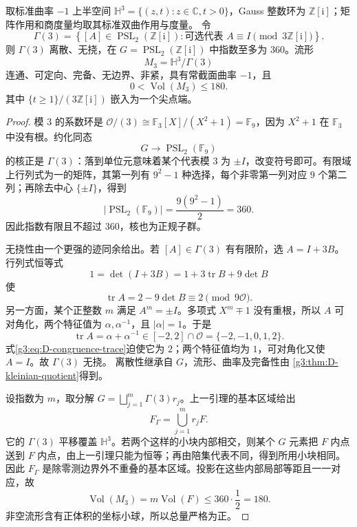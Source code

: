\begin{theorem}\label{g3:thm:D-gaussian-finite-volume}
	取标准曲率 \(-1\) 上半空间 \(\mathbb H^3=\{(z,t):z\in\mathbb C,t>0\}\)，Gauss 整数环为 \(\mathbb Z[\mathrm i]\)；矩阵作用和商度量均取其标准双曲作用与度量。
	令
	\[
		\Gamma(3)=
		\left\{[A]\in\operatorname{PSL}_2(\mathbb Z[\mathrm i]):
		    \text{可选代表 }A\equiv I\pmod{3\mathbb Z[\mathrm i]}\right\}.
	\]
	则 \(\Gamma(3)\) 离散、无挠，在 \(G=\operatorname{PSL}_2(\mathbb Z[\mathrm i])\)
	中指数至多为 \(360\)。流形
	\[
		M_3=\mathbb H^3/\Gamma(3)
	\]
	连通、可定向、完备、无边界、非紧，具有常截面曲率 \(-1\)，且
	\[
		0<\operatorname{Vol}(M_3)\le180.
	\]
	其中 \(\{t\ge1\}/(3\mathbb Z[\mathrm i])\) 嵌入为一个尖点端。
\end{theorem}
\begin{proof}
	模 \(3\) 的系数环是
	\(\mathcal O/(3)\cong\mathbb F_3[X]/(X^2+1)=\mathbb F_9\)，因为
	\(X^2+1\) 在 \(\mathbb F_3\) 中没有根。约化同态
	\[
		G\longrightarrow\operatorname{PSL}_2(\mathbb F_9)
	\]
	的核正是 \(\Gamma(3)\)：落到单位元意味着某个代表模 \(3\) 为
	\(\pm I\)，改变符号即可。有限域上行列式为一的矩阵，其第一列有
	\(9^2-1\) 种选择，每个非零第一列对应 \(9\) 个第二列；再除去中心
	\(\{\pm I\}\)，得到
	\[
		|\operatorname{PSL}_2(\mathbb F_9)|
		     =\frac{9(9^2-1)}2=360.
	\]
	因此指数有限且不超过 \(360\)，核也为正规子群。

	无挠性由一个更强的迹同余给出。若 \([A]\in\Gamma(3)\) 有有限阶，选
	\(A=I+3B\)。行列式恒等式
	\[
		1=\det(I+3B)=1+3\operatorname{tr}B+9\det B
	\]
	使
	\begin{equation}\label{g3:eq:D-congruence-trace}
		\operatorname{tr}A=2-9\det B\equiv2\pmod{9\mathcal O}.
	\end{equation}
	另一方面，某个正整数 \(m\) 满足 \(A^m=\pm I\)。多项式
	\(X^m\mp1\) 没有重根，所以 \(A\) 可对角化，两个特征值为
	\(\alpha,\alpha^{-1}\)，且 \(|\alpha|=1\)。于是
	\[
		\operatorname{tr}A=\alpha+\alpha^{-1}\in[-2,2]\cap\mathcal O
		                         =\{-2,-1,0,1,2\}.
	\]
	式\eqref{g3:eq:D-congruence-trace}迫使它为 \(2\)；两个特征值均为
	\(1\)，可对角化又使 \(A=I\)。故 \(\Gamma(3)\) 无挠。
	离散性继承自 \(G\)，流形、曲率及完备性由
	\cref{g3:thm:D-kleinian-quotient}得到。

	设指数为 \(m\)，取分解
	\(G=\bigsqcup_{j=1}^m\Gamma(3)r_j\)。上一引理的基本区域给出
	\[
		F_{\Gamma}=\bigcup_{j=1}^m r_jF.
	\]
	它的 \(\Gamma(3)\) 平移覆盖 \(\mathbb H^3\)。若两个这样的小块内部相交，则某个 \(G\) 元素把 \(F\) 内点送到 \(F\) 内点，由上一引理只能为恒等；再由陪集代表不同，得到所用小块相同。因此 \(F_\Gamma\) 是除零测边界外不重叠的基本区域。投影在这些内部局部等距且一一对应，故
	\[
		\operatorname{Vol}(M_3)
		    =m\operatorname{Vol}(F)\le360\cdot\frac12=180.
	\]
	非空流形含有正体积的坐标小球，所以总量严格为正。


\end{proof}
